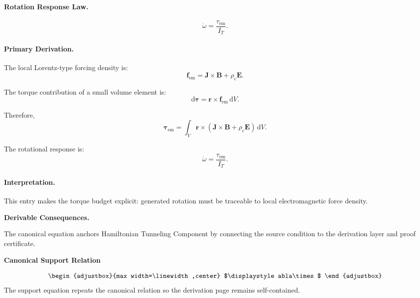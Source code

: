 \paragraph{Rotation Response Law.}
\begin{equation}
\dot{\omega}
=
\frac{\tau_{\mathrm{em}}}{I_T}.
\end{equation}

\paragraph{Primary Derivation.}
The local Lorentz-type forcing density is:
\begin{equation}
\mathbf{f}_{\mathrm{em}}
=
\mathbf{J}\times\mathbf{B}
+
\rho_e\mathbf{E}.
\end{equation}

The torque contribution of a small volume element is:
\begin{equation}
\mathrm{d}\boldsymbol{\tau}
=
\mathbf{r}\times\mathbf{f}_{\mathrm{em}}\,\mathrm{d}V .
\end{equation}

Therefore,
\begin{equation}
\boldsymbol{\tau}_{\mathrm{em}}
=
\int_V
\mathbf{r}\times
\left(
\mathbf{J}\times\mathbf{B}
+
\rho_e\mathbf{E}
\right)
\,\mathrm{d}V .
\end{equation}

The rotational response is:
\begin{equation}
\boxed{
\dot{\omega}
=
\frac{\tau_{\mathrm{em}}}{I_T}.
}
\end{equation}

\paragraph{Interpretation.}
This entry makes the torque budget explicit: generated rotation must be traceable to local electromagnetic force density.

\par\vspace{0.35em}
\noindent\textbf{Derivable Consequences.}\quad
\begingroup
\footnotesize
\raggedright
The canonical equation anchors Hamiltonian Tunneling Component by connecting the source condition to the derivation layer and proof certificate.
\par\endgroup

\noindent\textbf{Canonical Support Relation}\par
\[
\begin{adjustbox}{max width=\linewidth,center}
$\displaystyle
abla\times
$
\end{adjustbox}
\]
\noindent The support equation repeats the canonical relation so the derivation page remains self-contained.\par

